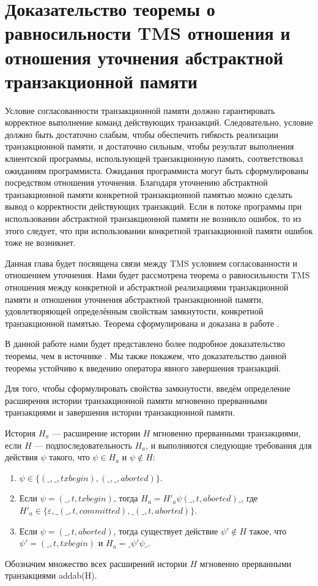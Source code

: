 \chapter{Доказательство теоремы о равносильности TMS отношения и отношения уточнения абстрактной транзакционной памяти}
Условие согласованности транзакционной памяти должно гарантировать корректное выполнение команд действующих транзакций. Следовательно, условие должно быть достаточно слабым, чтобы обеспечить гибкость реализации транзакционной памяти, и достаточно сильным, чтобы результат выполнения клиентской программы, использующей транзакционную память, соответствовал ожиданиям программиста. Ожидания программиста могут быть сформулированы посредством отношения уточнения. Благодаря уточнению абстрактной транзакционной памяти конкретной транзакционной памятью можно сделать вывод о корректности действующих транзакций. Если в потоке программы при использовании абстрактной транзакционной памяти не возникло ошибок, то из этого следует, что при использовании конкретной транзакционной памяти ошибок тоже не возникнет. 

Данная глава будет посвящена связи между TMS условием согласованности и отношением уточнения. Нами будет рассмотрена теорема о равносильности TMS отношения между конкретной и абстрактной реализациями транзакционной памяти и отношения уточнения абстрактной транзакционной памяти, удовлетворяющей определённым свойствам замкнутости, конкретной транзакционной памятью. Теорема сформулирована и доказана в работе \cite{tms_article}.

В данной работе нами будет представлено более подробное доказательство теоремы, чем в источнике \cite{tms_article}. Мы также покажем, что доказательство данной теоремы \cite{tms_article} устойчиво к введению оператора явного завершения транзакций. 

Для того, чтобы сформулировать свойства замкнутости, введём определение расширения  истории транзакционной памяти мгновенно прерванными транзакциями и завершения истории транзакционной памяти.  
\begin{mydefinition} История $H_a$ --- расширение истории $H$ мгновенно прерванными транзакциями, если $H$ --- подпоследовательность $H_a$, и выполняются следующие требования для действия $\psi$ такого, что $\psi \in H_a$ и $\psi \notin H$:
\begin{enumerate}
\item $\psi \in \{(\_, \_, txbegin), (\_, \_, aborted)\}$.
\item Если $\psi = (\_, t, txbegin)$, тогда $H_a = H'_a\psi(\_, t, aborted)\_$, где $H'_a \in \{\varepsilon, \_(\_, t, committed), \_(\_, t, aborted)\}$.
\item Если $\psi = (\_, t, aborted)$, тогда существует действие $\psi' \notin H$ такое, что $\psi' = (\_, t, txbegin)$ и $H_a = \_\psi'\psi\_$. 
\end{enumerate}
Обозначим множество всех расширений истории $H$ мгновенно прерванными транзакциями addab(H).
\end{mydefinition}

